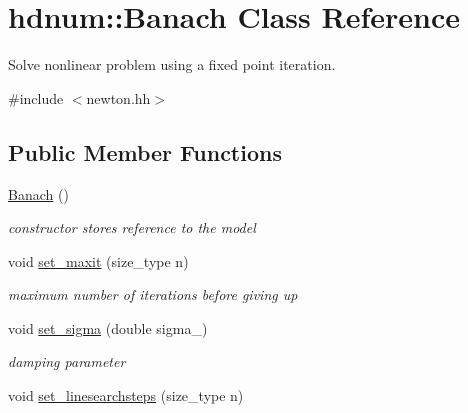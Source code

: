\hypertarget{classhdnum_1_1Banach}{
\section{hdnum::Banach Class Reference}
\label{classhdnum_1_1Banach}
}


Solve nonlinear problem using a fixed point iteration.  




{\ttfamily \#include $<$newton.hh$>$}

\subsection*{Public Member Functions}
\begin{DoxyCompactItemize}
\item 
\hypertarget{classhdnum_1_1Banach_adf23579a36e22dfd389717f5a285d302}{
\hyperlink{classhdnum_1_1Banach_adf23579a36e22dfd389717f5a285d302}{Banach} ()}
\label{classhdnum_1_1Banach_adf23579a36e22dfd389717f5a285d302}

\begin{DoxyCompactList}\small\item\em constructor stores reference to the model \item\end{DoxyCompactList}\item 
\hypertarget{classhdnum_1_1Banach_aaf1b52f0b43c1cc11baeaef4791df405}{
void \hyperlink{classhdnum_1_1Banach_aaf1b52f0b43c1cc11baeaef4791df405}{set\_\-maxit} (size\_\-type n)}
\label{classhdnum_1_1Banach_aaf1b52f0b43c1cc11baeaef4791df405}

\begin{DoxyCompactList}\small\item\em maximum number of iterations before giving up \item\end{DoxyCompactList}\item 
\hypertarget{classhdnum_1_1Banach_a8d484eb07503b30a841633fe79e1606d}{
void \hyperlink{classhdnum_1_1Banach_a8d484eb07503b30a841633fe79e1606d}{set\_\-sigma} (double sigma\_\-)}
\label{classhdnum_1_1Banach_a8d484eb07503b30a841633fe79e1606d}

\begin{DoxyCompactList}\small\item\em damping parameter \item\end{DoxyCompactList}\item 
\hypertarget{classhdnum_1_1Banach_a2f49ae28bb889fb7ccab6ebb61944567}{
void \hyperlink{classhdnum_1_1Banach_a2f49ae28bb889fb7ccab6ebb61944567}{set\_\-linesearchsteps} (size\_\-type n)}
\label{classhdnum_1_1Banach_a2f49ae28bb889fb7ccab6ebb61944567}


\end{DoxyCompactItemize}
